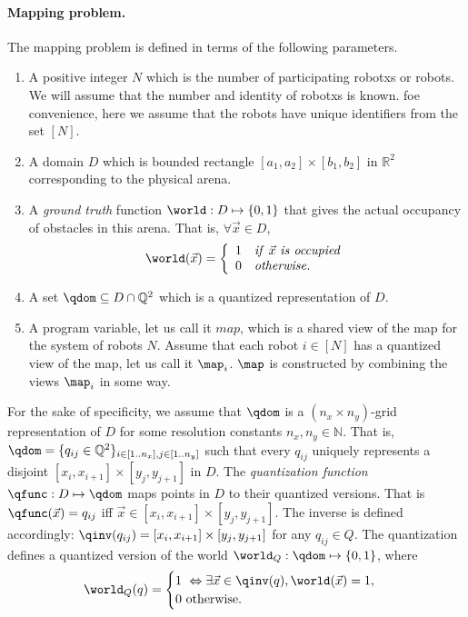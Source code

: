 \paragraph{Mapping problem.}
The mapping problem is defined in terms of the following parameters.
\begin{enumerate}
	\item A positive integer $N$ which is the number of participating robotxs or robots. We will assume that the number and identity of robotxs is known. foe convenience, here we assume that the robots have unique identifiers from the set $[N]$.
	\item A domain $D$ which is bounded rectangle $[a_1,a_2]\times [b_1,b_2]$ in $\mathbb{R}^2$ corresponding to the physical arena.
	\item A \emph{ground truth} function $\world : D\mapsto \left\{0,1\right\}$ that gives the actual  occupancy of obstacles in this arena. That is, $\forall \Vec{x} \in D$,
\begin{align}
\world(\Vec{x}) =
		\left\{
		\begin{array}{ll}
			1 & \mathit{if}\ \Vec{x} \ \mathit{is \ occupied}\\
			0 & \mathit{otherwise}.
		\end{array}
		\right.
\end{align}
	\item A set $\qdom \subseteq D \cap \mathbb{Q}^2$ which is a quantized representation of $D$.
	\item A \lgname{} program variable, let us call it $\mathit{map}$, which is a shared view of the map for the system of robots $N$. Assume that each robot $i \in [N]$ has a quantized view of the map, let us call it $\map_i$. $\map$ is constructed by combining the views $\map_i$ in some way.
\end{enumerate}
For the sake of specificity, we assume that $\qdom$ is a $(n_x\times n_y)$-grid representation of $D$ for some resolution constants $n_x,n_y \in \mathbb{N}$. That is, $\qdom = \{q_{ij} \in \mathbb{Q}^2\}_{i\in [1..n_x], j\in [1..n_y]}$ such that every $q_{ij}$ uniquely represents a disjoint $[x_i, x_{i+1}] \times [y_j, y_{j+1}]$ in $D$.
%
    The \emph{quantization function}  $\qfunc:D \mapsto \qdom$ maps points in $D$ to their quantized versions. That is $\qfunc(\Vec{x}) = q_{ij}$ iff $\Vec{x} \in [x_i, x_{i+1}] \times [y_j, y_{j+1}]$.
The inverse is defined accordingly: $\qinv(q_{ij}) =  [x_i, x_{i+1}] \times [y_j, y_{j+1}]$ for any $q_{ij} \in Q$.
%
The quantization defines a quantized version of the world $\world_Q : \qdom \mapsto \left\{0,1\right\}$, where
$$\world_Q(q) = \begin{cases}
        1\ \Leftrightarrow \exists \Vec{x}\in \qinv(q), \world(\Vec{x}) = 1, \\
        0\ \mbox{otherwise}.
\end{cases}
$$
%

